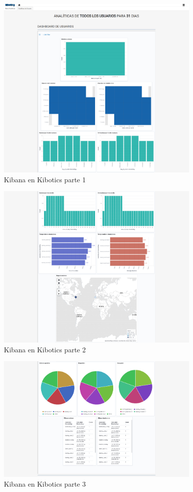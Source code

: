 \documentclass[11pt,a4paper]{book}
\begin{document}
				
				\begin{figure}[H]
					\centering
					\includegraphics[width=10cm, keepaspectratio]{img/kibana_kibotics_01.png}
					\caption{Kibana en Kibotics parte 1}
					\label{fig:kibana_kibotics_01}
				\end{figure}
				\begin{figure}[H]
					\centering
					\includegraphics[width=10cm, keepaspectratio]{img/kibana_kibotics_02.png}
					\caption{Kibana en Kibotics parte 2}
					\label{fig:kibana_kibotics_02}
				\end{figure}
				\begin{figure}[H]
					\centering
					\includegraphics[width=10cm, keepaspectratio]{img/kibana_kibotics_03.png}
					\caption{Kibana en Kibotics parte 3}
					\label{fig:kibana_kibotics_03}
				\end{figure}
\end{document}
